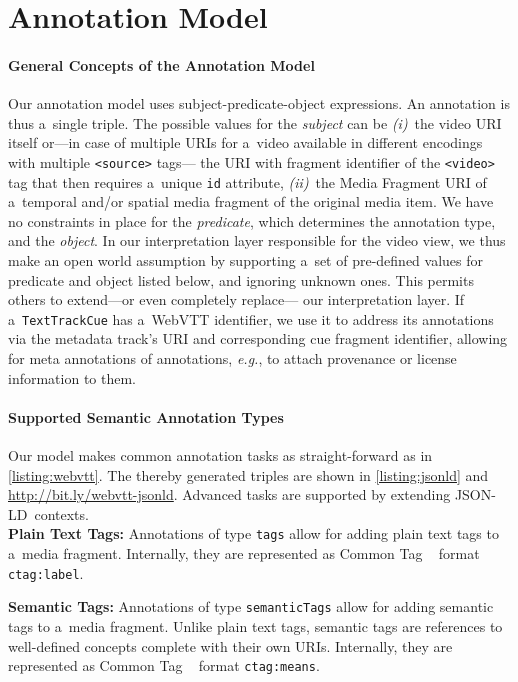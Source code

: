 \documentclass{sig-alternate}
\newcommand{\inlinelistingsize}{\fontsize{8pt}{11pt}}
\let\oldurl\url
\renewcommand{\url}[1]{\inlinelistingsize\oldurl{#1}}
\def\JSONLD{\mbox{JSON-LD}}
\begin{document}
\section{Annotation Model}

\paragraph{General Concepts of the Annotation Model}

Our annotation model uses subject-predicate-object expressions.
An annotation is thus a~single triple.
The possible values for the \emph{subject} can be \emph{(i)}~the video
URI itself or---in case of multiple URIs for a~video available
in different encodings with multiple \texttt{<source>} tags---%
the URI with fragment identifier of the \texttt{<video>} tag
that then requires a~unique \texttt{id} attribute,
\emph{(ii)}~the Media Fragment URI of a~temporal and/or spatial
media fragment of the original media item.
We have no constraints in place for the \emph{predicate},
which determines the annotation type, and the \emph{object}.
In our interpretation layer responsible for the video view,
we thus make an open world assumption
by supporting a~set of pre-defined values for predicate and object
listed below, and ignoring unknown ones.
This permits others to extend---or even completely replace---%
our interpretation layer.
If a~\texttt{TextTrackCue} has a~WebVTT identifier,
we use it to address its annotations
via the metadata track's URI
and corresponding cue fragment identifier,
allowing for meta annotations of annotations, \emph{e.g.},
to attach provenance or license information to them.

\paragraph{Supported Semantic Annotation Types}

Our model makes common annotation tasks as
straight-forward as in \autoref{listing:webvtt}.
The thereby generated triples are shown in
\autoref{listing:jsonld} and \url{http://bit.ly/webvtt-jsonld}.
Advanced tasks are supported by extending \JSONLD~contexts.\\

\noindent \textbf{Plain Text Tags:} Annotations of type
  \texttt{tags} allow for add\-ing plain text tags
  to a~media fragment.
  Internally, they are represented as Common Tag%
  ~\cite{commontag2009spec} format \texttt{ctag:label}.

\noindent \textbf{Semantic Tags:} Annotations of type
  \texttt{semanticTags} allow for adding semantic tags
  to a~media fragment.
  Unlike plain text tags, semantic tags are references to
  well-defined concepts complete with their own URIs.
  Internally, they are represented as Common Tag%
  ~\cite{commontag2009spec} format \texttt{ctag:means}.
\end{document}
